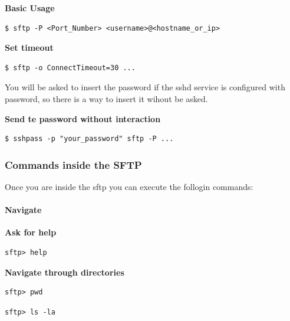 \documentclass{article}
\newenvironment{codetemplate}[1][]{%
  \mybasecolorbox[#1]
  \itshape
}{%
  \endmybasecolorbox
}
\begin{document}
\textbf{Basic Usage}
\begin{codetemplate}{}
\begin{verbatim}
$ sftp -P <Port_Number> <username>@<hostname_or_ip>
\end{verbatim}
\end{codetemplate}

\textbf{Set timeout}
\begin{codetemplate}{}
\begin{verbatim}
$ sftp -o ConnectTimeout=30 ...
\end{verbatim}
\end{codetemplate}

You will be asked to insert the password if the sshd service is configured with password, so there is a way to insert it wihout be asked.

\textbf{Send te password without interaction}
\begin{codetemplate}{}
\begin{verbatim}
$ sshpass -p "your_password" sftp -P ...
\end{verbatim}
\end{codetemplate}

\subsubsection{Commands inside the SFTP}

Once you are inside the sftp you can execute the follogin commands:

\paragraph{Navigate}

\textbf{Ask for help}
\begin{codetemplate}{}
\begin{verbatim}
sftp> help
\end{verbatim}
\end{codetemplate}

\textbf{Navigate through directories}
\begin{codetemplate}{}
\begin{verbatim}
sftp> pwd
\end{verbatim}
\end{codetemplate}

\begin{codetemplate}{}
\begin{verbatim}
sftp> ls -la
\end{verbatim}
\end{codetemplate}
\end{document}
